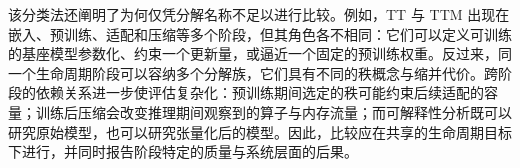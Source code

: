 \documentclass[11pt]{article}
\begin{document}
该分类法还阐明了为何仅凭分解名称不足以进行比较。例如，TT 与 TTM 出现在嵌入、预训练、适配和压缩等多个阶段，但其角色各不相同：它们可以定义可训练的基座模型参数化、约束一个更新量，或逼近一个固定的预训练权重。反过来，同一个生命周期阶段可以容纳多个分解族，它们具有不同的秩概念与缩并代价。跨阶段的依赖关系进一步使评估复杂化：预训练期间选定的秩可能约束后续适配的容量；训练后压缩会改变推理期间观察到的算子与内存流量；而可解释性分析既可以研究原始模型，也可以研究张量化后的模型。因此，比较应在共享的生命周期目标下进行，并同时报告阶段特定的质量与系统层面的后果。

\end{document}
